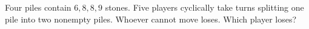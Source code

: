 Four piles contain $6,8,8,9$ stones. Five players cyclically take turns splitting one pile into two nonempty piles. Whoever cannot move loses. Which player loses?
